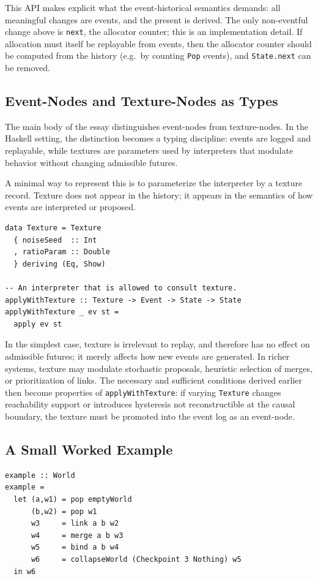 \documentclass[11pt]{article}
\begin{document}
This API makes explicit what the event-historical semantics demands: all
meaningful changes are events, and the present is derived. The only non-eventful
change above is \texttt{next}, the allocator counter; this is an implementation
detail. If allocation must itself be replayable from events, then the allocator
counter should be computed from the history (e.g.\ by counting \texttt{Pop}
events), and \texttt{State.next} can be removed.

\subsection{Event-Nodes and Texture-Nodes as Types}

The main body of the essay distinguishes event-nodes from texture-nodes. In the
Haskell setting, the distinction becomes a typing discipline: events are logged
and replayable, while textures are parameters used by interpreters that modulate
behavior without changing admissible futures.

A minimal way to represent this is to parameterize the interpreter by a texture
record. Texture does not appear in the history; it appears in the semantics of
how events are interpreted or proposed.

\begin{verbatim}
data Texture = Texture
  { noiseSeed  :: Int
  , ratioParam :: Double
  } deriving (Eq, Show)

-- An interpreter that is allowed to consult texture.
applyWithTexture :: Texture -> Event -> State -> State
applyWithTexture _ ev st =
  apply ev st
\end{verbatim}

In the simplest case, texture is irrelevant to replay, and therefore has no
effect on admissible futures; it merely affects how new events are generated.
In richer systems, texture may modulate stochastic proposals, heuristic
selection of merges, or prioritization of links. The necessary and sufficient
conditions derived earlier then become properties of \texttt{applyWithTexture}:
if varying \texttt{Texture} changes reachability support or introduces hysteresis
not reconstructible at the causal boundary, the texture must be promoted into
the event log as an event-node.

\subsection{A Small Worked Example}

\begin{verbatim}
example :: World
example =
  let (a,w1) = pop emptyWorld
      (b,w2) = pop w1
      w3     = link a b w2
      w4     = merge a b w3
      w5     = bind a b w4
      w6     = collapseWorld (Checkpoint 3 Nothing) w5
  in w6
\end{verbatim}
\end{document}
